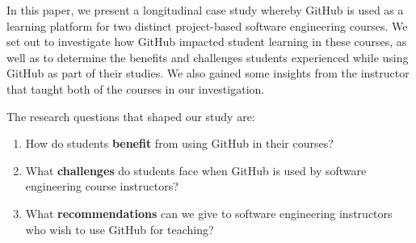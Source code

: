 


In this paper, we present a longitudinal case study whereby GitHub is used as a learning platform for two distinct project-based software engineering courses. We set out to investigate how GitHub impacted student learning in these courses, as well as to determine the benefits and challenges students experienced while using GitHub as part of their studies. We also gained some insights from the instructor that taught both of the courses in our investigation.

The research questions that shaped our study are:
\begin{enumerate}
\item How do students \textbf{benefit} from using GitHub in their courses?
\item What \textbf{challenges} do students face when GitHub is used by software engineering course instructors?
\item What \textbf{recommendations} can we give to software engineering instructors who wish to use GitHub for teaching?
\end{enumerate}

